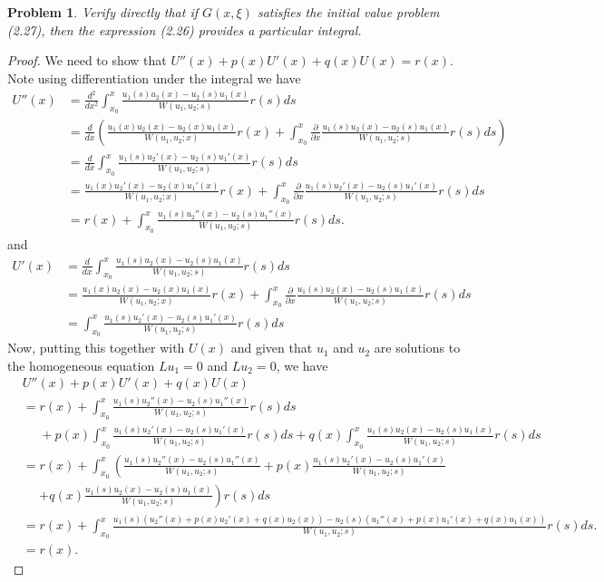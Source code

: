 \documentclass{article}
\newtheorem{problem}{Problem}
\begin{document}
\begin{problem}
Verify directly that if $G(x, \xi)$ satisfies the initial value problem (2.27), then the expression (2.26) provides a particular integral.
\end{problem}
\begin{proof}
We need to show that $U''(x) + p(x)U'(x) + q(x)U(x) = r(x)$. Note using differentiation under the integral we have
\begin{align*}
U''(x)
&= \frac{d^2}{dx^2} \int_{x_0}^x \frac{u_1(s)u_2(x) - u_2(s)u_1(x)}{W(u_1, u_2; s)} r(s)ds\\
&= \frac{d}{d x} \left ( \frac{u_1(x)u_2(x) - u_2(x)u_1(x)}{W(u_1, u_2; x)}r(x) + \int_{x_0}^x \frac{\partial}{\partial x} \frac{u_1(s)u_2(x) - u_2(s)u_1(x)}{W(u_1, u_2; s)} r(s)ds \right )\\
&= \frac{d}{d x} \int_{x_0}^x \frac{u_1(s)u_2'(x) - u_2(s)u_1'(x)}{W(u_1, u_2; s)} r(s) ds\\
&= \frac{u_1(x)u_2'(x) - u_2(x)u_1'(x)}{W(u_1, u_2; x)} r(x) + \int_{x_0}^x \frac{\partial}{\partial x} \frac{u_1(s)u_2'(x) - u_2(s)u_1'(x)}{W(u_1, u_2; s)} r(s) ds\\
&= r(x) + \int_{x_0}^x \frac{u_1(s)u_2''(x) - u_2(s)u_1''(x)}{W(u_1, u_2; s)} r(s) ds.
\end{align*}
and
\begin{align*}
U'(x)
&= \frac{d}{dx} \int_{x_0}^x \frac{u_1(s)u_2(x) - u_2(s)u_1(x)}{W(u_1, u_2; s)} r(s)ds\\
&= \frac{u_1(x)u_2(x) - u_2(x)u_1(x)}{W(u_1, u_2; x)} r(x) + \int_{x_0}^x \frac{\partial}{\partial x} \frac{u_1(s)u_2(x) - u_2(s)u_1(x)}{W(u_1, u_2; s)} r(s)ds\\
&= \int_{x_0}^x \frac{u_1(s)u_2'(x) - u_2(s)u_1'(x)}{W(u_1, u_2; s)} r(s) ds
\end{align*}
Now, putting this together with $U(x)$ and given that $u_1$ and $u_2$ are solutions to the homogeneous equation $Lu_1 = 0$ and $Lu_2 = 0$, we have
\begin{align*}
&U''(x) + p(x)U'(x) + q(x)U(x)\\
&= r(x) + \int_{x_0}^x \frac{u_1(s)u_2''(x) - u_2(s)u_1''(x)}{W(u_1, u_2; s)} r(s) ds\\
&~~~~~~+ p(x)\int_{x_0}^x \frac{u_1(s)u_2'(x) - u_2(s)u_1'(x)}{W(u_1, u_2; s)} r(s) ds + q(x)\int_{x_0}^x \frac{u_1(s)u_2(x) - u_2(s)u_1(x)}{W(u_1, u_2; s)} r(s) ds\\
&= r(x) + \int_{x_0}^x \left ( \frac{u_1(s)u_2''(x) - u_2(s)u_1''(x)}{W(u_1, u_2; s)} + p(x)\frac{u_1(s)u_2'(x) - u_2(s)u_1'(x)}{W(u_1, u_2; s)} \right. \\
&~~~~~~\left. + q(x)\frac{u_1(s)u_2(x) - u_2(s)u_1(x)}{W(u_1, u_2; s)} \right ) r(s) ds\\
&= r(x) + \int_{x_0}^x \frac{u_1(s)(u_2''(x) + p(x)u_2'(x) + q(x)u_2(x)) - u_2(s)(u_1''(x) + p(x)u_1'(x) + q(x)u_1(x))}{W(u_1, u_2; s)} r(s) ds.\\
&= r(x).
\end{align*}
\end{proof}
\end{document}
